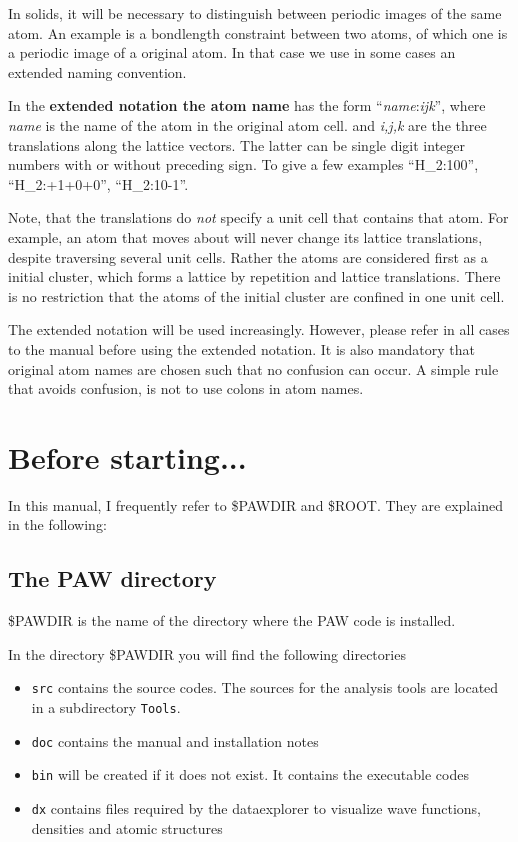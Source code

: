 \documentclass[final,12pt,makeidx,DIV=calc]{article}
\begin{document}
In solids, it will be necessary to distinguish between periodic images
of the same atom. An example is a bondlength constraint between two
atoms, of which one is a periodic image of a original atom. In that
case we use in some cases an extended naming convention.

In the \textbf{extended notation the atom name} has the form
``\textit{name}:\textit{ijk}'', where {\it name} is the name of the
atom in the original atom cell. and {\it i,j,k} are the three
translations along the lattice vectors. The latter can be single digit
integer numbers with or without preceding sign. To give a few
examples ``H\_2:100'', ``H\_2:+1+0+0'', ``H\_2:10-1''.

Note, that the translations do {\em not} specify a unit cell that
contains that atom. For example, an atom that moves about will never
change its lattice translations, despite traversing several unit
cells. Rather the atoms are considered first as a initial cluster, which forms
a lattice by repetition and lattice translations. There is no
restriction that the atoms of the initial cluster are confined in one
unit cell.

The extended notation will be used increasingly. However, please refer
in all cases to the manual before using the extended notation. It is
also mandatory that original atom names are chosen such that no
confusion can occur. A simple rule that avoids confusion, is not to
use colons in atom names.


\newpage
\section{Before starting...}
In this manual, I frequently refer to \$PAWDIR and \$ROOT. They are
explained in the following:

\subsection{The PAW directory}
\$PAWDIR is the name of the directory where the PAW code is
installed. 

In the directory \$PAWDIR you will find the following directories 
\begin{itemize}
\item \verb|src| contains the source codes. The sources for the
analysis tools are located in a subdirectory \verb|Tools|.
\item \verb|doc| contains the manual and installation notes
\item \verb|bin| will be created if it does not exist. It contains the
executable codes
\item \verb|dx| contains files required by the dataexplorer to
visualize wave functions, densities and atomic structures
\end{itemize}
\end{document}

